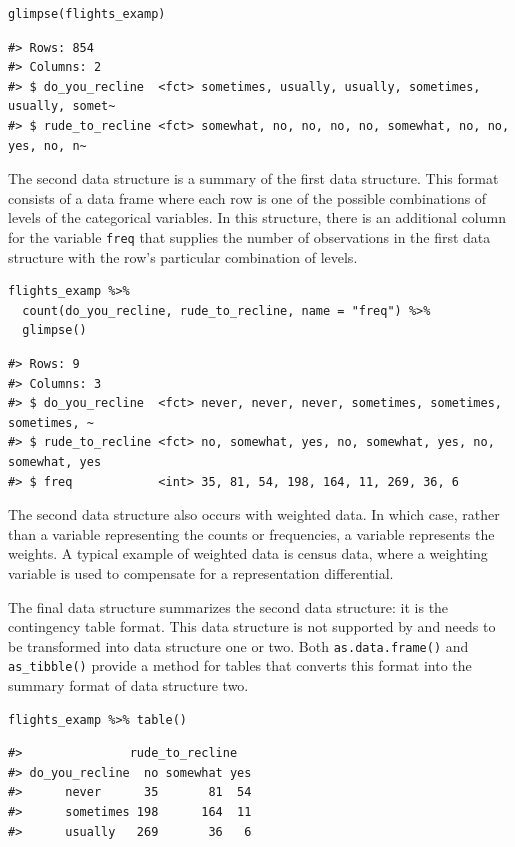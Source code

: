\begin{verbatim}
glimpse(flights_examp)
\end{verbatim}

\begin{verbatim}
#> Rows: 854
#> Columns: 2
#> $ do_you_recline  <fct> sometimes, usually, usually, sometimes, usually, somet~
#> $ rude_to_recline <fct> somewhat, no, no, no, no, somewhat, no, no, yes, no, n~
\end{verbatim}

The second data structure is a summary of the first data structure. This format consists of a data frame where each row is one of the possible combinations of levels of the categorical variables. In this structure, there is an additional column for the variable \texttt{freq} that supplies the number of observations in the first data structure with the row's particular combination of levels.

\begin{verbatim}
flights_examp %>% 
  count(do_you_recline, rude_to_recline, name = "freq") %>% 
  glimpse()
\end{verbatim}

\begin{verbatim}
#> Rows: 9
#> Columns: 3
#> $ do_you_recline  <fct> never, never, never, sometimes, sometimes, sometimes, ~
#> $ rude_to_recline <fct> no, somewhat, yes, no, somewhat, yes, no, somewhat, yes
#> $ freq            <int> 35, 81, 54, 198, 164, 11, 269, 36, 6
\end{verbatim}

The second data structure also occurs with weighted data. In which case, rather than a variable representing the counts or frequencies, a variable represents the weights. A typical example of weighted data is census data, where a weighting variable is used to compensate for a representation differential.

The final data structure summarizes the second data structure: it is the contingency table format. This data structure is not supported by  and needs to be transformed into data structure one or two. Both \texttt{as.data.frame()} and \texttt{as\_tibble()} provide a method for tables that converts this format into the summary format of data structure two.

\begin{verbatim}
flights_examp %>% table()
\end{verbatim}

\begin{verbatim}
#>               rude_to_recline
#> do_you_recline  no somewhat yes
#>      never      35       81  54
#>      sometimes 198      164  11
#>      usually   269       36   6
\end{verbatim}

